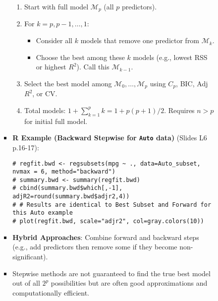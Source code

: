 \documentclass[12pt,a4paper]{article}
\newcommand{\Robject}[1]{\texttt{#1}} %
\begin{document}
\begin{itemize}
\begin{itemize}
\begin{itemize}
\begin{itemize}
\begin{enumerate}
                    \item Start with full model $\mathcal{M}_p$ (all $p$ predictors).
                    \item For $k=p, p-1, \dots, 1$:
                        \begin{itemize}
                            \item Consider all $k$ models that remove one predictor from $\mathcal{M}_k$.
                            \item Choose the best among these $k$ models (e.g., lowest RSS or highest $R^2$). Call this $\mathcal{M}_{k-1}$.
                        \end{itemize}
                    \item Select the best model among $\mathcal{M}_0, \dots, \mathcal{M}_p$ using $C_p$, BIC, Adj $R^2$, or CV.
                    \item Total models: $1 + \sum_{k=1}^{p} k = 1 + p(p+1)/2$. Requires $n>p$ for initial full model.
                \end{enumerate}
            \item \textbf{R Example (Backward Stepwise for \Robject{Auto} data)} (Slides L6 p.16-17):
\begin{lstlisting}[caption={Backward Stepwise with leaps::regsubsets (Slides L6 p.16)}]
# regfit.bwd <- regsubsets(mpg ~ ., data=Auto_subset, nvmax = 6, method="backward")
# summary.bwd <- summary(regfit.bwd)
# cbind(summary.bwd$which[,-1], adjR2=round(summary.bwd$adjr2,4))
# # Results are identical to Best Subset and Forward for this Auto example
# plot(regfit.bwd, scale="adjr2", col=gray.colors(10))
\end{lstlisting}
            \item \textbf{Hybrid Approaches}: Combine forward and backward steps (e.g., add predictors then remove some if they become non-significant).
            \item Stepwise methods are not guaranteed to find the true best model out of all $2^p$ possibilities but are often good approximations and computationally efficient.
        \end{itemize}


\end{itemize}
\end{itemize}
\end{itemize}
\end{document}
